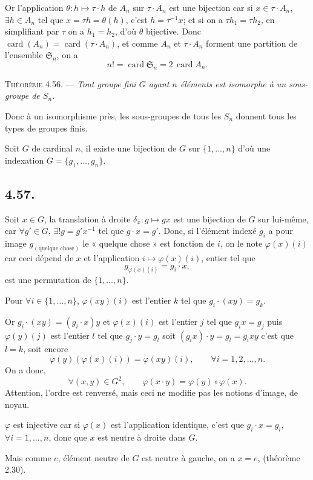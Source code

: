 Or l'application $\theta:h\mapsto\tau\cdot h$ de $A_n$ sur $\tau\cdot A_n$ est une bijection car si $x\in\tau\cdot A_n$, $\exists h\in A_n$ tel que $x=\tau h=\theta(h)$, c'est $h=\tau^{-1}x$; et si on a $\tau h_1=\tau h_2$, en simplifiant par $\tau$ on a $h_1=h_2$, d'où $\theta$ bijective. Donc $\operatorname{card}(A_n)=\operatorname{card}(\tau\cdot A_n)$, et comme $A_n$ et $\tau\cdot A_n$ forment une partition de l'ensemble $\mathfrak S_n$, on a
\[
n!=\operatorname{card}\mathfrak S_n=2\,\operatorname{card}A_n.
\]
\bookend

\medskip\noindent\textsc{Théorème 4.56.} --- \emph{Tout groupe fini $G$ ayant $n$ éléments est isomorphe à un sous-groupe de $S_n$.}

Donc à un isomorphisme près, les sous-groupes de tous les $S_n$ donnent tous les types de groupes finis.

Soit $G$ de cardinal $n$, il existe une bijection de $G$ sur $\{1,\ldots,n\}$ d'où une indexation $G=\{g_1,\ldots,g_n\}$.

\subsection*{4.57.}
Soit $x\in G$, la translation à droite $\delta_x:g\mapsto gx$ est une bijection de $G$ sur lui-même, car $\forall g'\in G$, $\exists!g=g'x^{-1}$ tel que $g\cdot x=g'$. Donc, si l'élément indexé $g_i$ a pour image $g_{(\text{quelque chose})}$ le « quelque chose » est fonction de $i$, on le note $\varphi(x)(i)$ car ceci dépend de $x$ et l'application $i\mapsto\varphi(x)(i)$, entier tel que
\[
g_{\varphi(x)(i)}=g_i\cdot x,
\]
est une permutation de $\{1,\ldots,n\}$.

Pour $\forall i\in\{1,\ldots,n\}$, $\varphi(xy)(i)$ est l'entier $k$ tel que $g_i\cdot(xy)=g_k$.

Or $g_i\cdot(xy)=(g_i\cdot x)y$ et $\varphi(x)(i)$ est l'entier $j$ tel que $g_i x=g_j$ puis $\varphi(y)(j)$ est l'entier $l$ tel que $g_j\cdot y=g_l$ soit $(g_ix)\cdot y=g_l=g_i xy$ c'est que $l=k$, soit encore
\[
\varphi(y)(\varphi(x)(i))=\varphi(xy)(i),\qquad \forall i=1,2,\ldots,n.
\]
On a donc,
\[
\forall(x,y)\in G^2,\qquad \varphi(x\cdot y)=\varphi(y)\circ\varphi(x).
\]
Attention, l'ordre est renversé, mais ceci ne modifie pas les notions d'image, de noyau.

$\varphi$ est injective car si $\varphi(x)$ est l'application identique, c'est que $g_i\cdot x=g_i$, $\forall i=1,\ldots,n$, donc que $x$ est neutre à droite dans $G$.

Mais comme $e$, élément neutre de $G$ est neutre à gauche, on a $x=e$, (théorème 2.30).

